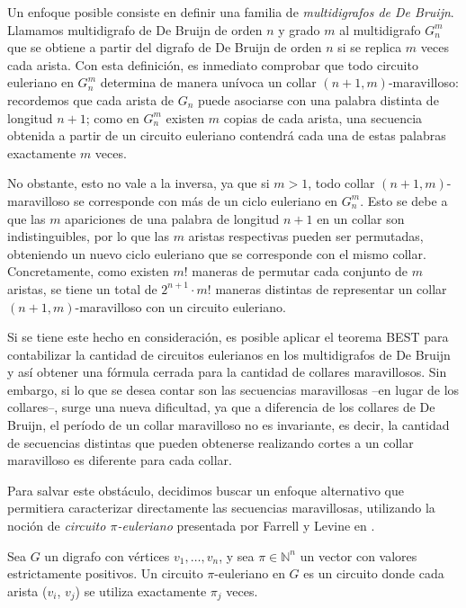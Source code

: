 \documentclass[11pt]{article}
\begin{document}
Un enfoque posible consiste en definir una familia de \emph{multidigrafos de De
	Bruijn}.
Llamamos multidigrafo de De Bruijn de orden $n$ y grado $m$ al multidigrafo
$G_n^m$ que se obtiene a partir del digrafo de De Bruijn de orden $n$ si se
replica $m$ veces cada arista.
Con esta definición, es inmediato comprobar que todo circuito euleriano en
$G_n^m$ determina de manera unívoca un collar $(n+1, m)$-maravilloso:
recordemos que cada arista de $G_n$ puede asociarse con una palabra distinta de
longitud $n+1$; como en $G_n^m$ existen $m$ copias de cada arista, una
secuencia obtenida a partir de un circuito euleriano contendrá cada una de
estas palabras exactamente $m$ veces.

No obstante, esto no vale a la inversa, ya que si $m > 1$, todo collar
$(n+1,m)$-maravilloso se corresponde con más de un ciclo euleriano en $G_n^m$.
Esto se debe a que las $m$ apariciones de una palabra de longitud $n + 1$ en un
collar son indistinguibles, por lo que las $m$ aristas respectivas pueden ser
permutadas, obteniendo un nuevo ciclo euleriano que se corresponde con el mismo
collar.
Concretamente, como existen $m! $ maneras de permutar cada conjunto de $m$
aristas, se tiene un total de $2^{n+1} \cdot m!$ maneras distintas de
representar un collar $(n+1,m)$-maravilloso con un circuito euleriano.

Si se tiene este hecho en consideración, es posible aplicar el teorema BEST
para contabilizar la cantidad de circuitos eulerianos en los multidigrafos de
De Bruijn y así obtener una fórmula cerrada para la cantidad de collares
maravillosos.
Sin embargo, si lo que se desea contar son las secuencias maravillosas --en
lugar de los collares--, surge una nueva dificultad, ya que a diferencia de los
collares de De Bruijn, el período de un collar maravilloso no es invariante, es
decir, la cantidad de secuencias distintas que pueden obtenerse realizando
cortes a un collar maravilloso es diferente para cada collar.

Para salvar este obstáculo, decidimos buscar un enfoque alternativo que
permitiera caracterizar directamente las secuencias maravillosas, utilizando la
noción de \emph{circuito $\pi$-euleriano} presentada por Farrell y Levine en
\cite{Farrell_Levine_2016}.

\begin{definition}
	Sea $G$ un digrafo con vértices $v_1, \dots, v_n$, y sea $\pi \in
		\mathbb{N}^n$
	un vector con valores estrictamente positivos.
	Un circuito $\pi$-euleriano en $G$ es un circuito donde cada arista
	($v_i$, $v_j$) se utiliza exactamente $\pi_j$ veces.
\end{definition}
\end{document}
